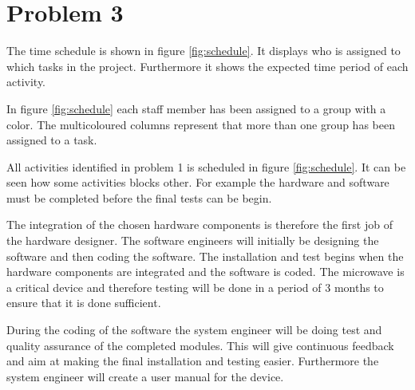 \chapter{Problem 3}

The time schedule is shown in figure \ref{fig:schedule}. It displays who is assigned to which tasks in the project. Furthermore it shows the expected time period of each activity.

In figure \ref{fig:schedule} each staff member has been assigned to a group with a color. The multicoloured columns represent that more than one group has been assigned to a task.

All activities identified in problem 1 is scheduled in figure \ref{fig:schedule}. It can be seen how some activities blocks other. For example the hardware and software must be completed before the final tests can be begin.

The integration of the chosen hardware components is therefore the first job of the hardware designer. The software engineers will initially be designing the software and then coding the software. The installation and test begins when the hardware components are integrated and the software is coded. The microwave is a critical device and therefore testing will be done in a period of 3 months to ensure that it is done sufficient.

During the coding of the software the system engineer will be doing test and quality assurance of the completed modules. This will give continuous feedback and aim at making the final installation and testing easier. Furthermore the system engineer will create a user manual for the device.



